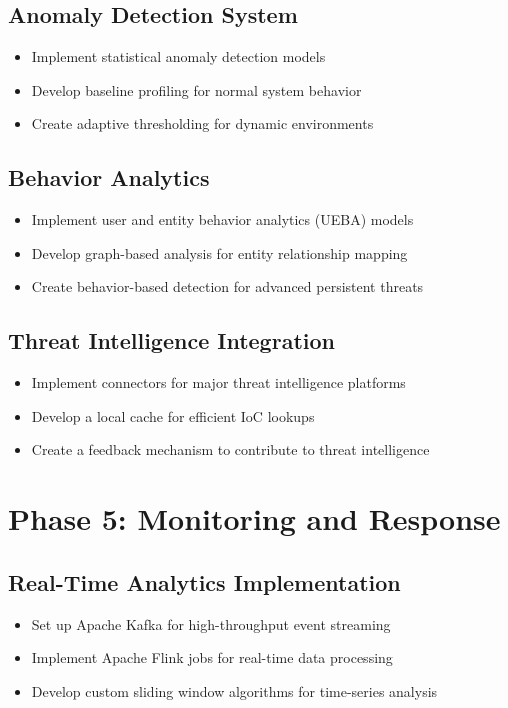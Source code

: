 \subsection{Anomaly Detection System}
\begin{itemize}
    \item Implement statistical anomaly detection models
    \item Develop baseline profiling for normal system behavior
    \item Create adaptive thresholding for dynamic environments
\end{itemize}

\subsection{Behavior Analytics}
\begin{itemize}
    \item Implement user and entity behavior analytics (UEBA) models
    \item Develop graph-based analysis for entity relationship mapping
    \item Create behavior-based detection for advanced persistent threats
\end{itemize}

\subsection{Threat Intelligence Integration}
\begin{itemize}
    \item Implement connectors for major threat intelligence platforms
    \item Develop a local cache for efficient IoC lookups
    \item Create a feedback mechanism to contribute to threat intelligence
\end{itemize}

\section{Phase 5: Monitoring and Response}

\subsection{Real-Time Analytics Implementation}
\begin{itemize}
    \item Set up Apache Kafka for high-throughput event streaming
    \item Implement Apache Flink jobs for real-time data processing
    \item Develop custom sliding window algorithms for time-series analysis
\end{itemize}

